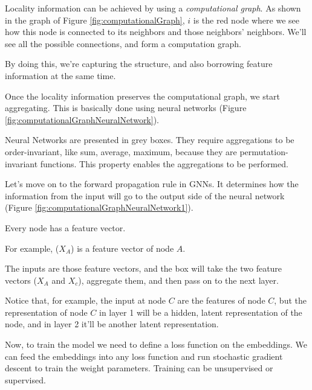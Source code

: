 Locality information can be achieved by using a \textit{computational graph}. As
shown in the graph of Figure \ref{fig:computationalGraph}, $i$ is the red node
where we see how this node is connected to its neighbors and those neighbors’
neighbors. We’ll see all the possible connections, and form a computation graph.
\newline

By doing this, we’re capturing the structure, and also borrowing feature
information at the same time.
\newline

Once the locality information preserves the computational graph, we start aggregating.
This is basically done using neural networks (Figure \ref{fig:computationalGraphNeuralNetwork}).
\newline

Neural Networks are presented in grey boxes. They require aggregations to be order-invariant,
like sum, average, maximum, because they are permutation-invariant functions.
This property enables the aggregations to be performed.
\newline

Let’s move on to the forward propagation rule in GNNs. It determines how the information
from the input will go to the output side of the neural network (Figure
\ref{fig:computationalGraphNeuralNetwork1}).
\newline

Every node has a feature vector.
\newline

For example, ($X_{A}$) is a feature vector of node $A$.
\newline

The inputs are those feature vectors, and the box will take the two feature vectors
($X_{A}$ and $X_{c}$), aggregate them, and then pass on to the next layer.
\newline

Notice that, for example, the input at node $C$ are the features of node $C$,
but the representation of node $C$ in layer 1 will be a hidden, latent representation
of the node, and in layer 2 it’ll be another latent representation.
\newline

Now, to train the model we need to define a loss function on the embeddings. We
can feed the embeddings into any loss function and run stochastic gradient
descent to train the weight parameters. Training can be unsupervised or supervised.

